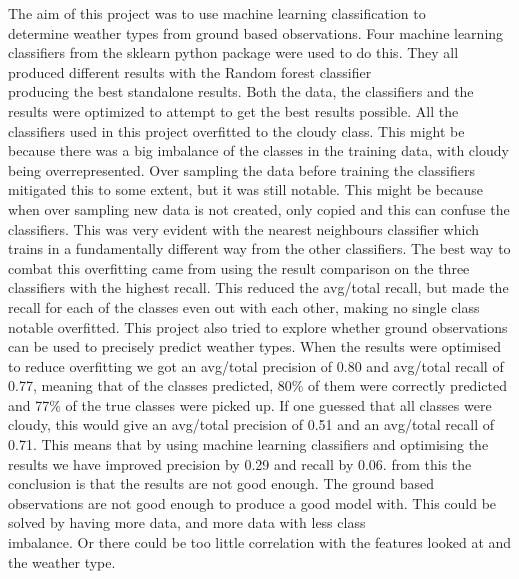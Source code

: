\documentclass[12pt]{article}
\begin{document}
The aim of this project was to use machine learning classification to \\ determine weather types from ground based observations. Four machine learning classifiers from the sklearn python package were used to do this. They all produced different results with the Random forest classifier \\ producing the best standalone results. Both the data, the classifiers and the results were optimized to attempt to get the best results possible. All the classifiers used in this project overfitted to the cloudy class. This might be because there was a big imbalance of the classes in the training data, with cloudy being overrepresented. Over sampling the data before training the classifiers mitigated this to some extent, but it was still notable. This might be because when over sampling new data is not created, only copied and this can confuse the classifiers. This was very evident with the nearest neighbours classifier which trains in a fundamentally different way from the other classifiers. The best way to combat this overfitting came from using the result comparison on the three classifiers with the highest recall. This reduced the avg/total recall, but made the recall for each of the classes even out with each other, making no single class notable overfitted. 
\newline \newline
This project also tried to explore whether ground observations can be used to precisely predict weather types. When the results were optimised to reduce overfitting we got an avg/total precision of 0.80 and avg/total recall of 0.77, meaning that of the classes predicted, 80\% of them were correctly predicted and 77\% of the true classes were picked up. If one guessed that all classes were cloudy, this would give an avg/total precision of 0.51 and an avg/total recall of 0.71. This means that by using machine learning classifiers and optimising the results we have improved precision by 0.29 and recall by 0.06.  from this the conclusion is that the results are not good enough. The ground based observations are not good enough to produce a good model with. This could be solved by having more data, and more data with less class \\ imbalance. Or there could be too little correlation with the features looked at and the weather type.



\newpage
\end{document}
